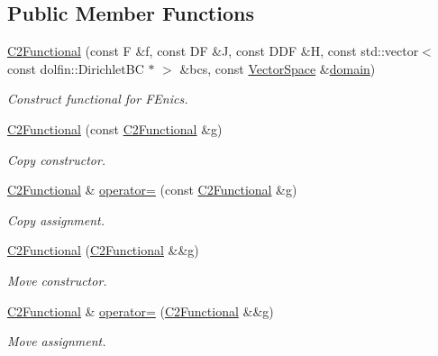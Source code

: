 \subsection*{Public Member Functions}
\begin{DoxyCompactItemize}
\item 
\hyperlink{classSpacy_1_1FEniCS_1_1C2Functional_a8f32c233a72dc3d25a656c1db12af943}{C2\+Functional} (const F \&f, const DF \&J, const D\+DF \&H, const std\+::vector$<$ const dolfin\+::\+Dirichlet\+BC $\ast$ $>$ \&bcs, const \hyperlink{classSpacy_1_1VectorSpace}{Vector\+Space} \&\hyperlink{classSpacy_1_1FunctionalBase_a2d3397deb9fa1ad85ed04e37a03b3aa6}{domain})
\begin{DoxyCompactList}\small\item\em Construct functional for F\+Enics. \end{DoxyCompactList}\item 
\hyperlink{classSpacy_1_1FEniCS_1_1C2Functional_addb84a06f7f82969c57e5bf1b65f2b68}{C2\+Functional} (const \hyperlink{classSpacy_1_1FEniCS_1_1C2Functional}{C2\+Functional} \&g)
\begin{DoxyCompactList}\small\item\em Copy constructor. \end{DoxyCompactList}\item 
\hyperlink{classSpacy_1_1FEniCS_1_1C2Functional}{C2\+Functional} \& \hyperlink{classSpacy_1_1FEniCS_1_1C2Functional_ab9ff23de1e812f6782b7db6ec01e0f4c}{operator=} (const \hyperlink{classSpacy_1_1FEniCS_1_1C2Functional}{C2\+Functional} \&g)
\begin{DoxyCompactList}\small\item\em Copy assignment. \end{DoxyCompactList}\item 
\hyperlink{classSpacy_1_1FEniCS_1_1C2Functional_af9ac63335fc062d18e08fa186312b5a2}{C2\+Functional} (\hyperlink{classSpacy_1_1FEniCS_1_1C2Functional}{C2\+Functional} \&\&g)
\begin{DoxyCompactList}\small\item\em Move constructor. \end{DoxyCompactList}\item 
\hyperlink{classSpacy_1_1FEniCS_1_1C2Functional}{C2\+Functional} \& \hyperlink{classSpacy_1_1FEniCS_1_1C2Functional_a96a909732f7f098d67ee5eba20406337}{operator=} (\hyperlink{classSpacy_1_1FEniCS_1_1C2Functional}{C2\+Functional} \&\&g)
\begin{DoxyCompactList}\small\item\em Move assignment. \end{DoxyCompactList}\item 

\end{DoxyCompactItemize}
